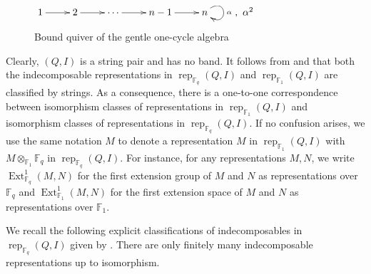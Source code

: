 \documentclass[12pt]{amsart}
\theoremstyle{remark}
\theoremstyle{definition}
\numberwithin{equation}{section}
\newcommand{\Ext}{\operatorname{Ext}\nolimits}
\begin{document}
\begin{figure}[ht]
  \centering
  $\xymatrix{
    1\ar[r] & 2\ar[r] & \cdots \ar[r] & n-1\ar[r] & n\ar@(ur,dr)^{\alpha}
  },\ \alpha^2$
  \caption{Bound quiver of the gentle one-cycle algebra}
  \label{fig:quiver-gentle one-cycle}
\end{figure}



Clearly, $(Q,I)$ is a string pair and has no band. It follows from  \cite{BR87} and \cite{TF25} that both  the indecomposable representations in $\operatorname{rep}_{\mathbb{F}_q}(Q,I)$ and $\operatorname{rep}_{\mathbb{F}_1}(Q,I)$ are classified by strings. As a consequence, there is a one-to-one correspondence between isomorphism classes of   representations in $\operatorname{rep}_{\mathbb{F}_1}(Q,I)$ and isomorphism classes of representations in  $\operatorname{rep}_{\mathbb{F}_q}(Q,I)$.   If no confusion arises, we use the same notation $M$ to denote a representation $M$ in $\operatorname{rep}_{\mathbb{F}_1}(Q,I)$ with $M\otimes_{\mathbb{F}_1}\mathbb{F}_q$ in $\operatorname{rep}_{\mathbb{F}_q}(Q,I)$.
For instance, for any representations $M,N$, we write $\Ext^1_{\mathbb{F}_q}(M,N)$ for the first extension group of $M$ and $N$ as representations over $\mathbb{F}_q$ and $\Ext^1_{\mathbb{F}_1}(M,N)$ for the first extension space of $M$ and $N$ as representations over $\mathbb{F}_1$.

We recall the following explicit classifications of indecomposables in $\operatorname{rep}_{\mathbb{F}_q}(Q,I)$
given by \cite[Theorem 2.8]{CY24}. There are only finitely many indecomposable representations up to isomorphism.
\end{document}
